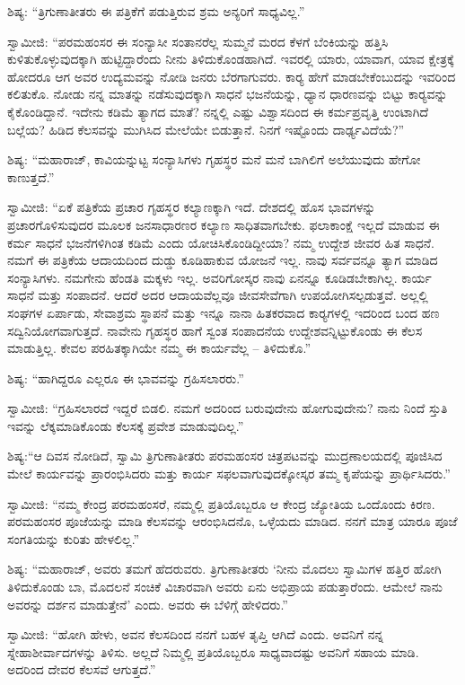  ಶಿಷ್ಯ: “ತ್ರಿಗುಣಾತೀತರು ಈ ಪತ್ರಿಕೆಗೆ ಪಡುತ್ತಿರುವ ಶ್ರಮ ಅನ್ಯರಿಗೆ ಸಾಧ್ಯವಿಲ್ಲ.” 

 ಸ್ವಾಮೀಜಿ: “ಪರಮಹಂಸರ ಈ ಸಂನ್ಯಾಸೀ ಸಂತಾನರೆಲ್ಲ ಸುಮ್ಮನೆ ಮರದ ಕೆಳಗೆ ಬೆಂಕಿಯನ್ನು ಹತ್ತಿಸಿ ಕುಳಿತುಕೊಳ್ಳುವುದಕ್ಕಾಗಿ ಹುಟ್ಟಿದ್ದಾರೆಂದು ನೀನು ತಿಳಿದುಕೊಂಡಹಾಗಿದೆ. ಇವರಲ್ಲಿ ಯಾರು, ಯಾವಾಗ, ಯಾವ ಕ್ಷೇತ್ರಕ್ಕೆ ಹೋದರೂ ಆಗ ಅವರ ಉದ್ಯಮವನ್ನು ನೋಡಿ ಜನರು ಬೆರಗಾಗುವರು. ಕಾರ‍್ಯ ಹೇಗೆ ಮಾಡಬೇಕೆಂಬುದನ್ನು ಇವರಿಂದ ಕಲಿತುಕೊ. ನೋಡು ನನ್ನ ಮಾತನ್ನು ನಡೆಸುವುದಕ್ಕಾಗಿ ಸಾಧನೆ ಭಜನೆಯನ್ನು, ಧ್ಯಾನ ಧಾರಣವನ್ನು ಬಿಟ್ಟು ಕಾರ‍್ಯವನ್ನು ಕೈಕೊಂಡಿದ್ದಾನೆ. ಇದೇನು ಕಡಿಮೆ ತ್ಯಾಗದ ಮಾತೆ? ನನ್ನಲ್ಲಿ ಎಷ್ಟು ವಿಶ್ವಾಸದಿಂದ ಈ ಕರ್ಮಪ್ರವೃತ್ತಿ ಉಂಟಾಗಿದೆ ಬಲ್ಲೆಯ? ಹಿಡಿದ ಕೆಲಸವನ್ನು ಮುಗಿಸಿದ ಮೇಲೆಯೇ ಬಿಡುತ್ತಾನೆ. ನಿನಗೆ ಇಷ್ಟೊಂದು ದಾರ್ಢ್ಯವಿದೆಯೆ?” 

 ಶಿಷ್ಯ: “ಮಹಾರಾಜ್, ಕಾವಿಯನ್ನುಟ್ಟ ಸಂನ್ಯಾಸಿಗಳು ಗೃಹಸ್ಥರ ಮನೆ ಮನೆ ಬಾಗಿಲಿಗೆ ಅಲೆಯುವುದು ಹೇಗೋ ಕಾಣುತ್ತದೆ.” 

 ಸ್ವಾಮೀಜಿ: “ಏಕೆ ಪತ್ರಿಕೆಯ ಪ್ರಚಾರ ಗೃಹಸ್ಥರ ಕಲ್ಯಾಣಕ್ಕಾಗಿ ಇದೆ. ದೇಶದಲ್ಲಿ ಹೊಸ ಭಾವಗಳನ್ನು ಪ್ರಚಾರಗೊಳಿಸುವುದರ ಮೂಲಕ ಜನಸಾಧಾರಣರ ಕಲ್ಯಾಣ ಸಾಧಿತವಾಗಬೇಕು. ಫಲಾಕಾಂಕ್ಷೆ ಇಲ್ಲದೆ ಮಾಡುವ ಈ ಕರ್ಮ ಸಾಧನೆ ಭಜನೆಗಳಿಗಿಂತ ಕಡಿಮೆ ಎಂದು ಯೋಚಿಸಿಕೊಂಡಿದ್ದೀಯಾ? ನಮ್ಮ ಉದ್ದೇಶ ಜೀವರ ಹಿತ ಸಾಧನೆ. ನಮಗೆ ಈ ಪತ್ರಿಕೆಯ ಆದಾಯದಿಂದ ದುಡ್ಡು ಕೂಡಿಹಾಕುವ ಯೋಜನೆ ಇಲ್ಲ. ನಾವು ಸರ್ವವನ್ನೂ ತ್ಯಾಗ ಮಾಡಿದ ಸಂನ್ಯಾಸಿಗಳು. ನಮಗೇನು ಹೆಂಡತಿ ಮಕ್ಕಳು ಇಲ್ಲ. ಅವರಿಗೋಸ್ಕರ ನಾವು ಏನನ್ನೂ ಕೂಡಿಡಬೇಕಾಗಿಲ್ಲ. ಕಾರ್ಯ ಸಾಧನೆ ಮತ್ತು ಸಂಪಾದನೆ. ಆದರೆ ಅದರ ಆದಾಯವೆಲ್ಲವೂ ಜೀವಸೇವೆಗಾಗಿ ಉಪಯೋಗಿಸಲ್ಪಡುತ್ತವೆ. ಅಲ್ಲಲ್ಲಿ ಸಂಘಗಳ ಏರ್ಪಾಡು, ಸೇವಾಶ್ರಮ ಸ್ಥಾಪನೆ ಮತ್ತು ಇನ್ನೂ ನಾನಾ ಹಿತಕರವಾದ ಕಾರ‍್ಯಗಳಲ್ಲಿ ಇದರಿಂದ ಬಂದ ಹಣ ಸದ್ವಿನಿಯೋಗವಾಗುತ್ತದೆ. ನಾವೇನು ಗೃಹಸ್ಥರ ಹಾಗೆ ಸ್ವಂತ ಸಂಪಾದನೆಯ ಉದ್ದೇಶವನ್ನಿಟ್ಟುಕೊಂಡು ಈ ಕೆಲಸ ಮಾಡುತ್ತಿಲ್ಲ. ಕೇವಲ ಪರಹಿತಕ್ಕಾಗಿಯೇ ನಮ್ಮ ಈ ಕಾರ್ಯವೆಲ್ಲ – ತಿಳಿದುಕೊ.” 

 ಶಿಷ್ಯ: “ಹಾಗಿದ್ದರೂ ಎಲ್ಲರೂ ಈ ಭಾವವನ್ನು ಗ್ರಹಿಸಲಾರರು.” 

 ಸ್ವಾಮೀಜಿ: “ಗ್ರಹಿಸಲಾರದೆ ಇದ್ದರೆ ಬಿಡಲಿ. ನಮಗೆ ಅದರಿಂದ ಬರುವುದೇನು ಹೋಗುವುದೇನು? ನಾನು ನಿಂದೆ ಸ್ತುತಿ ಇವನ್ನು ಲೆಕ್ಕಮಾಡಿಕೊಂಡು ಕೆಲಸಕ್ಕೆ ಪ್ರವೇಶ ಮಾಡುವುದಿಲ್ಲ.” 

 ಶಿಷ್ಯ:‌“ಆ ದಿವಸ ನೋಡಿದೆ, ಸ್ವಾಮಿ ತ್ರಿಗುಣಾತೀತರು ಪರಮಹಂಸರ ಚಿತ್ರಪಟವನ್ನು ಮುದ್ರಣಾಲಯದಲ್ಲಿ ಪೂಜಿಸಿದ ಮೇಲೆ ಕಾರ್ಯವನ್ನು ಪ್ರಾರಂಭಿಸಿದರು ಮತ್ತು ಕಾರ್ಯ ಸಫಲವಾಗುವುದಕ್ಕೋಸ್ಕರ ತಮ್ಮ ಕೃಪೆಯನ್ನು ಪ್ರಾರ್ಥಿಸಿದರು.” 

 ಸ್ವಾಮೀಜಿ: “ನಮ್ಮ ಕೇಂದ್ರ ಪರಮಹಂಸರೆ, ನಮ್ಮಲ್ಲಿ ಪ್ರತಿಯೊಬ್ಬರೂ ಆ ಕೇಂದ್ರ ಜ್ಯೋತಿಯ ಒಂದೊಂದು ಕಿರಣ. ಪರಮಹಂಸರ ಪೂಜೆಯನ್ನು ಮಾಡಿ ಕೆಲಸವನ್ನು ಆರಂಭಿಸಿದನೊ, ಒಳ್ಳೆಯದು ಮಾಡಿದ. ನನಗೆ ಮಾತ್ರ ಯಾರೂ ಪೂಜೆ ಸಂಗತಿಯನ್ನು ಕುರಿತು ಹೇಳಲಿಲ್ಲ.” 

 ಶಿಷ್ಯ: “ಮಹಾರಾಜ್, ಅವರು ತಮಗೆ ಹೆದರುವರು. ತ್ರಿಗುಣಾತೀತರು ‘ನೀನು ಮೊದಲು ಸ್ವಾಮಿಗಳ ಹತ್ತಿರ ಹೋಗಿ ತಿಳಿದುಕೊಂಡು ಬಾ, ಮೊದಲನೆ ಸಂಚಿಕೆ ವಿಚಾರವಾಗಿ ಅವರು ಏನು ಅಭಿಪ್ರಾಯ ಪಡುತ್ತಾರೆಂದು. ಆಮೇಲೆ ನಾನು ಅವರನ್ನು ದರ್ಶನ ಮಾಡುತ್ತೇನೆ’ ಎಂದು. ಅವರು ಈ ಬೆಳಿಗ್ಗೆ ಹೇಳಿದರು.” 

 ಸ್ವಾಮೀಜಿ: “ಹೋಗಿ ಹೇಳು, ಅವನ ಕೆಲಸದಿಂದ ನನಗೆ ಬಹಳ ತೃಪ್ತಿ ಆಗಿದೆ ಎಂದು. ಅವನಿಗೆ ನನ್ನ ಸ್ನೇಹಾಶೀರ್ವಾದಗಳನ್ನು ತಿಳಿಸು. ಅಲ್ಲದೆ ನಿಮ್ಮಲ್ಲಿ ಪ್ರತಿಯೊಬ್ಬರೂ ಸಾಧ್ಯವಾದಷ್ಟು ಅವನಿಗೆ ಸಹಾಯ ಮಾಡಿ. ಅದರಿಂದ ದೇವರ ಕೆಲಸವೆ ಆಗುತ್ತದೆ.” 

